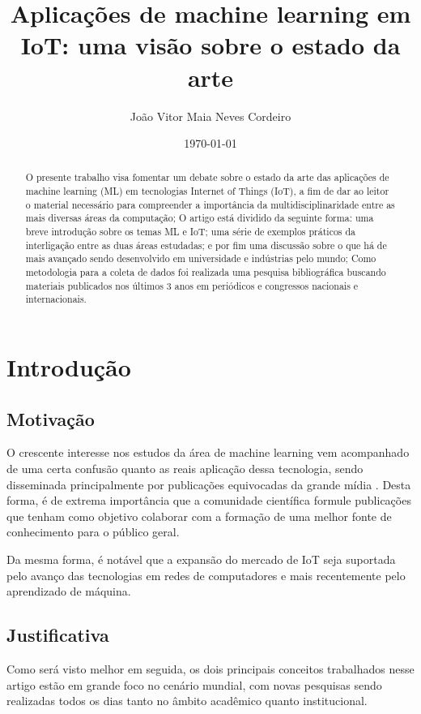 \documentclass[12pt]{article}
\author{João Vitor Maia Neves Cordeiro}
\title{Aplicações de machine learning em IoT: uma visão sobre o estado da arte}
\date{\today}
\begin{document}
\maketitle

\begin{abstract}

O presente trabalho visa fomentar um debate sobre o estado da arte das aplicações de machine learning (ML) em tecnologias Internet of Things (IoT), a fim de dar ao leitor o material necessário para compreender a importância da multidisciplinaridade entre as mais diversas áreas da computação; O artigo está dividido da seguinte forma: uma breve introdução sobre os temas ML e IoT; uma série de exemplos práticos da interligação entre as duas áreas estudadas; e por fim uma discussão sobre o que há de mais avançado sendo desenvolvido em universidade e indústrias pelo mundo; Como metodologia para a coleta de dados foi realizada uma pesquisa bibliográfica buscando materiais publicados nos últimos 3 anos em periódicos e congressos nacionais e internacionais.

\end{abstract}

\section{Introdução}

\subsection{Motivação}

O crescente interesse nos estudos da área de machine learning vem acompanhado de uma certa confusão quanto as reais aplicação dessa tecnologia, sendo disseminada principalmente por publicações equivocadas da grande mídia \cite{maram}. Desta forma, é de extrema importância que a comunidade científica formule publicações que tenham como objetivo colaborar com a formação de uma melhor fonte de conhecimento para o público geral.

Da mesma forma, é notável que a expansão do mercado de IoT seja suportada pelo avanço das tecnologias em redes de computadores e mais recentemente pelo aprendizado de máquina.

\subsection{Justificativa}

Como será visto melhor em seguida, os dois principais conceitos trabalhados nesse artigo estão em grande foco no cenário mundial, com novas pesquisas sendo realizadas todos os dias tanto no âmbito acadêmico quanto institucional.
\end{document}
